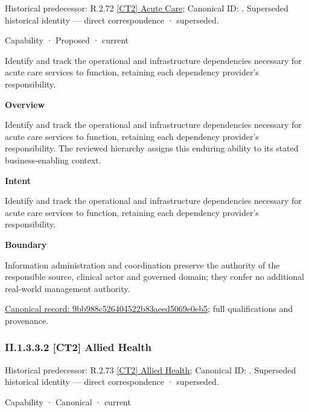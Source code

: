 {\small Historical predecessor: R.2.72 \hyperref[element:7b591957f7424424abc80f699e9f1960]{[CT2] Acute Care}; Canonical ID: \texttt{}. Superseded historical identity — direct correspondence · superseded.}\par
\label{element:9bb988c526404522b83aeed5069e0eb5}
{\small Capability · Proposed · current}\par

Identify and track the operational and infrastructure dependencies necessary for acute care services to function, retaining each dependency provider's responsibility.



\textbf{Overview}



Identify and track the operational and infrastructure dependencies necessary for acute care services to function, retaining each dependency provider's responsibility. The reviewed hierarchy assigns this enduring ability to its stated business-enabling context.



\textbf{Intent}



Identify and track the operational and infrastructure dependencies necessary for acute care services to function, retaining each dependency provider's responsibility.



\textbf{Boundary}



Information administration and coordination preserve the authority of the responsible source, clinical actor and governed domain; they confer no additional real-world management authority.


{\footnotesize \href{../../../../continuum/strategy/capability/9bb988c526404522b83aeed5069e0eb5.md}{Canonical record: 9bb988c526404522b83aeed5069e0eb5}; full qualifications and provenance.}\par
\subsubsection*{II.1.3.3.2 [CT2] Allied Health}
\label{navigation:II.1.3.3.2}

{\small Historical predecessor: R.2.73 \hyperref[element:6cd45c27d0c344b9807174dbd812d572]{[CT2] Allied Health}; Canonical ID: \texttt{}. Superseded historical identity — direct correspondence · superseded.}\par
\label{element:63cd714a3e2a4354aa5383b189fea566}
{\small Capability · Canonical · current}\par

